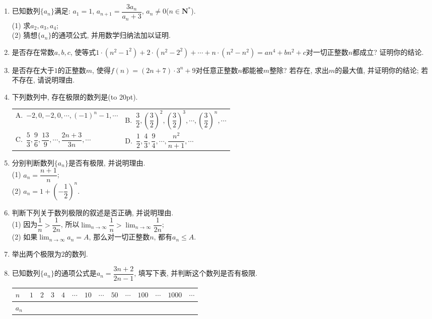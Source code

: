 \documentclass[10pt,a4paper]{article}
\newcommand{\bracket}[1]{(\hbox to #1pt{})}
\newcommand{\twoch}[4]{\par\begin{tabular}{p{.46\textwidth}p{.46\textwidth}}
A.~#1& B.~#2\\
C.~#3& D.~#4
\end{tabular}}
\begin{document}
\begin{enumerate}[1.]
\item 已知数列$\{a_n\}$满足: $a_1=1$, $a_{n+1}=\dfrac{3a_n}{a_n+3}$, $a_n\ne 0$($n\in \mathbf{N}^*$).\\
(1) 求$a_2,a_3,a_4$;\\
(2) 猜想$\{a_n\}$的通项公式, 并用数学归纳法加以证明.
\item 是否存在常数$a,b,c$, 使等式$1\cdot (n^2-1^2)+2\cdot (n^2-2^2)+\cdots +n\cdot (n^2-n^2)=an^4+bn^2+c$对一切正整数$n$都成立? 证明你的结论.
\item 是否存在大于$1$的正整数$m$, 使得$f(n)=(2n+7)\cdot 3^n+9$对任意正整数$n$都能被$m$整除? 若存在, 求出$m$的最大值, 并证明你的结论; 若不存在, 请说明理由.
\item 下列数列中, 存在极限的数列是\bracket{20}.
\twoch{$-2,0,-2,0,\cdots ,(-1)^n-1,\cdots$}{$\dfrac 32,(\dfrac 32)^2,(\dfrac 32)^3,\cdots ,(\dfrac 32)^n,\cdots$}{$\dfrac 53,\dfrac 96,\dfrac{13}9,\cdots ,\dfrac{2n+3}{3n},\cdots$}{$\dfrac 12,\dfrac 43,\dfrac 94,\cdots ,\dfrac{n^2}{n+1},\cdots$}
\item 分别判断数列$\{a_n\}$是否有极限, 并说明理由.\\
(1) $a_n=\dfrac{n+1}n$;\\
(2) $a_n=1+(-\dfrac 12)^n$.
\item 判断下列关于数列极限的叙述是否正确, 并说明理由.\\
(1) 因为$\dfrac 1n>\dfrac 1{2n}$, 所以$\displaystyle\lim_{n\to\infty}\dfrac 1n>\displaystyle\lim_{n\to\infty}\dfrac 1{2n}$;\\
(2) 如果$\displaystyle\lim_{n\to\infty}a_n=A$, 那么对一切正整数$n$, 都有$a_n\le A$.
\item 举出两个极限为$2$的数列.
\item 已知数列$\{a_n\}$的通项公式是$a_n=\dfrac{3n+2}{2n-1}$, 填写下表, 并判断这个数列是否有极限.
\begin{center}
\begin{tabular}{|p{}<{\centering}|p{}<{\centering}|p{}<{\centering}|p{}<{\centering}|p{}<{\centering}|p{}<{\centering}|p{}<{\centering}|p{}<{\centering}|p{}<{\centering}|p{}<{\centering}|p{}<{\centering}|p{}<{\centering}|p{}<{\centering}|p{}<{\centering}|}
    \hline
    $n$ & $1$ & $2$ & $3$ & $4$ & $\cdots$ & $10$ & $\cdots$ & $50$ & $\cdots$ & $100$ & $\cdots$ & $1000$ & $\cdots$ \\
    \hline    $a_n$  &&&&&&&&&&&&&\\ \hline

\end{tabular}
\end{center}
\end{enumerate}
\end{document}
